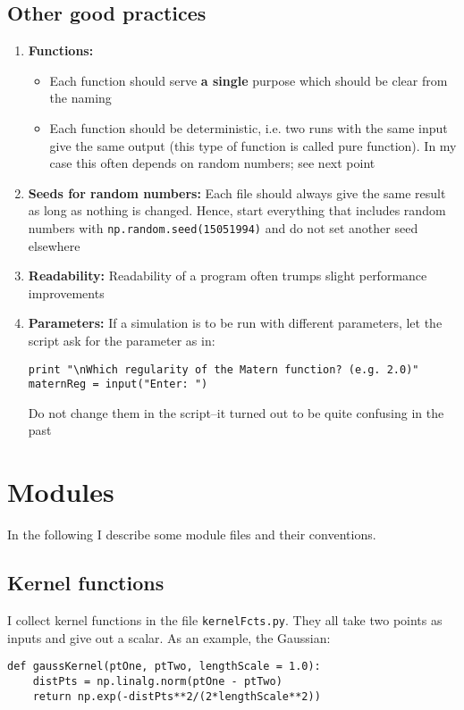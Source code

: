 \documentclass[11pt]{article}
\begin{document}
\subsection{Other good practices}
\begin{enumerate}
\item \textbf{Functions:}
\begin{itemize}
\item Each function should serve \textbf{a single} purpose which should be clear from the naming
\item Each function should be deterministic, i.e. two runs with the same input give the same output (this type of function is called pure function). In my case this often depends on random numbers; see next point
\end{itemize}
\item \textbf{Seeds for random numbers:} Each file should always give the same result as long as nothing is changed. Hence, start everything that includes random numbers with \texttt{np.random.seed(15051994)} and do not set another seed elsewhere
\item \textbf{Readability:} Readability of a program often trumps slight performance improvements
\item \textbf{Parameters:} If a simulation is to be run with different parameters, let the script ask for the parameter as in:
\begin{Verbatim}[formatcom=\color{blue!50!black}]
print "\nWhich regularity of the Matern function? (e.g. 2.0)"
maternReg = input("Enter: ")
\end{Verbatim}
Do not change them in the script--it turned out to be quite confusing in the past
\end{enumerate}

\section{Modules}

In the following I describe some module files and their conventions.



\subsection{Kernel functions}
	\label{subsec:kernelFcts}
I collect kernel functions in the file \texttt{kernelFcts.py}. They all take two points as inputs and give out a scalar. As an example, the Gaussian:
\begin{Verbatim}[formatcom=\color{blue!50!black}]
def gaussKernel(ptOne, ptTwo, lengthScale = 1.0):
    distPts = np.linalg.norm(ptOne - ptTwo)
    return np.exp(-distPts**2/(2*lengthScale**2))
\end{Verbatim}
\end{document}
